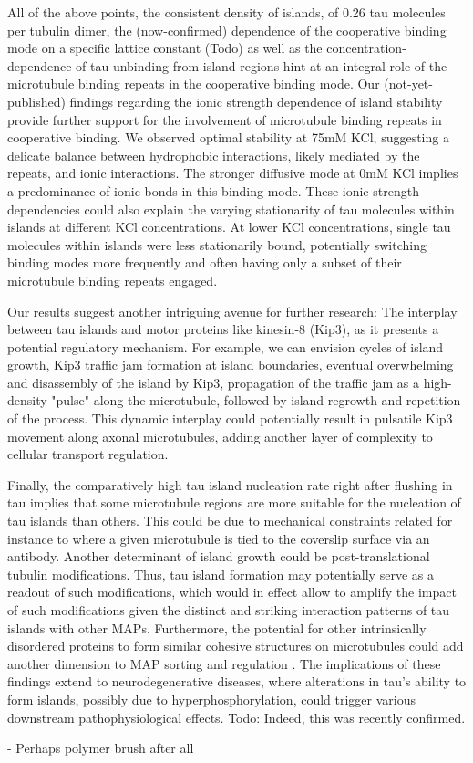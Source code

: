 All of the above points, the consistent density of islands, of 0.26 tau molecules per tubulin dimer, the (now-confirmed) dependence of the cooperative binding mode on a specific lattice constant (Todo) as well as the concentration-dependence of tau unbinding from island regions hint at an integral role of the microtubule binding repeats in the cooperative binding mode. Our (not-yet-published) findings regarding the ionic strength dependence of island stability  provide further support for the involvement of microtubule binding repeats in cooperative binding. We observed optimal stability at 75mM KCl, suggesting a delicate balance between hydrophobic interactions, likely mediated by the repeats, and ionic interactions. The stronger diffusive mode at 0mM KCl implies a predominance of ionic bonds in this binding mode. These ionic strength dependencies could also explain the varying stationarity of tau molecules within islands at different KCl concentrations. At lower KCl concentrations, single tau molecules within islands were less stationarily bound, potentially switching binding modes more frequently and often having only a subset of their microtubule binding repeats engaged.\par

Our results suggest another intriguing avenue for further research: The interplay between tau islands and motor proteins like kinesin-8 (Kip3), as it presents a potential regulatory mechanism. For example, we can envision cycles of island growth, Kip3 traffic jam formation at island boundaries, eventual overwhelming and disassembly of the island by Kip3, propagation of the traffic jam as a high-density "pulse" along the microtubule, followed by island regrowth and repetition of the process. This dynamic interplay could potentially result in pulsatile Kip3 movement along axonal microtubules, adding another layer of complexity to cellular transport regulation.\par


Finally, the comparatively high tau island nucleation rate right after flushing in tau  implies that some microtubule regions are more suitable for the nucleation of tau islands than others. This could be due to mechanical constraints related for instance to where a given microtubule is tied to the coverslip surface via an antibody. Another determinant of island growth could be post-translational tubulin modifications. Thus, tau island formation may potentially serve as a readout of such modifications, which would in effect allow to amplify the impact of such modifications given the distinct and striking interaction patterns of tau islands with other MAPs. Furthermore, the potential for other intrinsically disordered proteins to form similar cohesive structures on microtubules could add another dimension to MAP sorting and regulation \parencite{Monroy2018}.
The implications of these findings extend to neurodegenerative diseases, where alterations in tau's ability to form islands, possibly due to hyperphosphorylation, could trigger various downstream pathophysiological effects. Todo: Indeed, this was recently confirmed. 




- Perhaps polymer brush after all